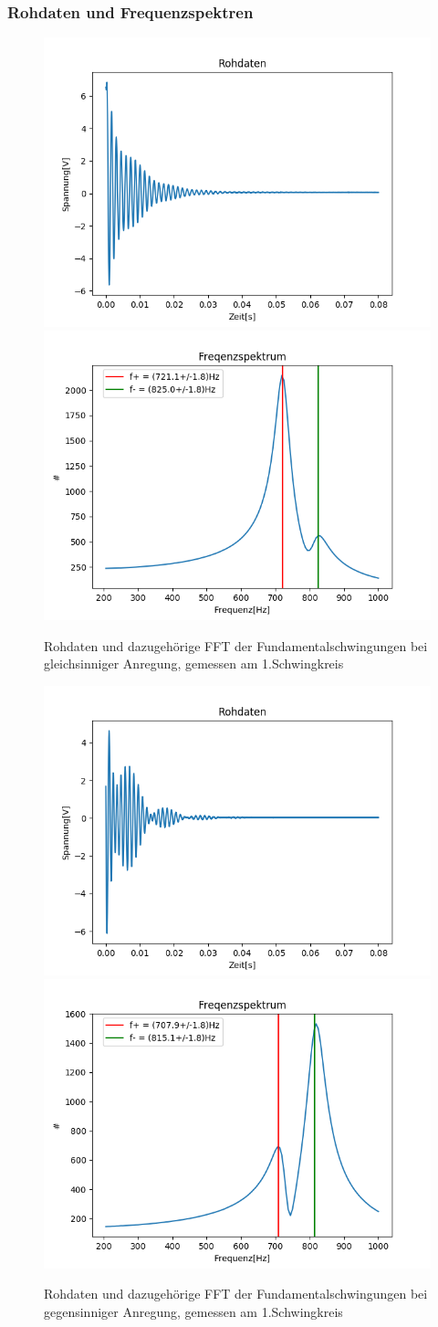 \documentclass[12pt,a4paper]{article}
\begin{document}
\subsubsection{Rohdaten und Frequenzspektren}
\begin{figure}
\begin{center}
\includegraphics[width=0.49\linewidth]{Bilder/Fund_Rohdaten1.PNG}
\includegraphics[width=0.49\linewidth]{Bilder/Fund_Frequenz1.PNG}
\end{center}
\caption[Aufbau Schwebung]{Rohdaten und dazugehörige FFT der Fundamentalschwingungen bei gleichsinniger Anregung, gemessen am 1.Schwingkreis}
\label{fig:Fund_Roh1}
\end{figure}

\begin{figure}
\begin{center}
\includegraphics[width=0.49\linewidth]{Bilder/Fund_Rohdaten2.PNG}
\includegraphics[width=0.49\linewidth]{Bilder/Fund_Frequenz2.PNG}
\end{center}
\caption[Aufbau Schwebung]{Rohdaten und dazugehörige FFT der Fundamentalschwingungen bei gegensinniger Anregung, gemessen am 1.Schwingkreis}
\label{fig:Fund_Roh2}
\end{figure}
\end{document}

